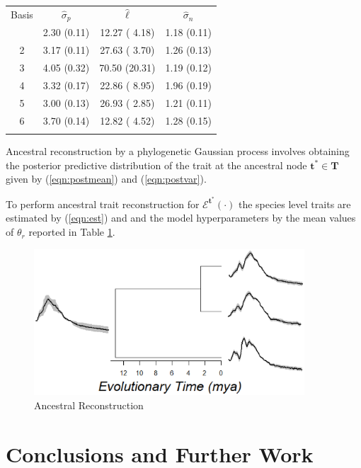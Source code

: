 \documentclass[wsdraft]{ws-rv9x6} %
\begin{document}
\begin{table}[ht]
	{
		\begin{tabular}{@{}cccc@{}} \toprule
			Basis & \(\hat{\sigma}_p\) & \(\hat{\ell}\) & \(\hat{\sigma}_n\) \\
			\colrule
			1 & 2.30 (0.11) & 12.27 ( 4.18) & 1.18 (0.11) \\
			2 & 3.17 (0.11) & 27.63 ( 3.70) & 1.26 (0.13) \\
			3 & 4.05 (0.32) & 70.50 (20.31) & 1.19 (0.12) \\
			4 & 3.32 (0.17) & 22.86 ( 8.95) & 1.96 (0.19) \\
			5 & 3.00 (0.13) & 26.93 ( 2.85) & 1.21 (0.11) \\
			6 & 3.70 (0.14) & 12.82 ( 4.52) & 1.28 (0.15) \\
			\botrule
		\end{tabular}
	}
	\label{tab::bat_results}
\end{table}

Ancestral reconstruction by a phylogenetic Gaussian process involves obtaining the posterior predictive distribution of the trait at the ancestral node \(\mathbf{t}^* \in \mathbf{T}\) given by (\ref{eqn:postmean}) and (\ref{eqn:postvar}).

To perform ancestral trait reconstruction for \(\mathcal{E}^{\mathbf{t}^*}(\cdot)\) the species level traits are estimated by (\ref{eqn:est}) and and the model hyperparameters by the mean values of \(\theta_r\) reported in Table \ref{tab::bat_results}.

\begin{figure}[h]
	\centering
	\includegraphics[width = 0.9\textwidth]{../Figures/ancrec.eps}
	\caption{Ancestral Reconstruction}
\end{figure}

\section{Conclusions and Further Work}
\end{document}
